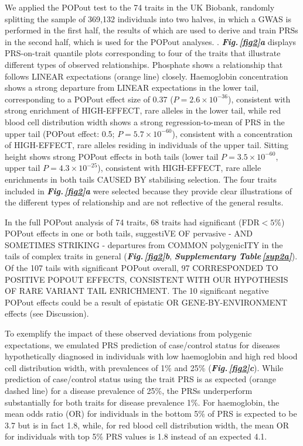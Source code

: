 \documentclass[12pt]{zHenriquesLab-StyleBioRxiv}
\newcommand\dref[2]{\normalsize{\textbf{\textit{Fig.\,\ref{#1}#2}}}\normalsize{}}
\newcommand\stref[1]{\normalsize{\textbf{\textit{Supplementary Table\,\ref{#1}}}}\normalsize{}}
\begin{document}
{{We applied the POPout test to the 74 traits in the UK Biobank, 
randomly splitting the sample of 369,132 individuals into two halves, 
in which a GWAS is performed in the first half, the results of which 
are used to derive and train PRSs in the second half, which is used 
for the POPout analyses. {\color{red}{The POPout test is performed in the same 
sample in which PRSs are trained, resulting in a conservative bias in 
POPout effects that we consider worthwhile to optimise sample 
size for testing in the tails (see Methods)}}. \dref{fig2}{a}  displays PRS-on-trait quantile plots corresponding 
to four of the traits that illustrate different types of 
observed relationships. Phosphate shows a relationship that 
follows LINEAR expectations (orange line) closely. 
Haemoglobin concentration shows a strong departure from 
LINEAR expectations in the lower tail, corresponding 
to a POPout effect size of 0.37 ($P = 2.6 \times 10^{-36}$), 
consistent with strong enrichment of HIGH-EFFECT, rare alleles in the lower 
tail, while red blood cell distribution width shows a strong 
regression-to-mean of PRS in the upper tail (POPout effect: 
0.5; $P = 5.7 \times 10^{-60}$), consistent with a concentration
of HIGH-EFFECT, rare alleles residing in individuals of 
the upper tail. Sitting height shows strong POPout effects in both 
tails (lower tail $P = 3.5 \times 10^{-60}$, upper 
tail $P = 4.3 \times 10^{-25}$), consistent with HIGH-EFFECT, rare allele 
enrichments in both tails CAUSED BY stabilising selection. The four 
traits included in \dref{fig2}{a}  were selected because they provide clear illustrations 
of the different types of relationship and are not reflective of 
the general results. 

In the full POPout analysis of 74 traits, 
68 traits had significant (FDR$<5\%$) POPout effects in one or both 
tails, suggestiVE OF pervasive - AND SOMETIMES STRIKING - departures from COMMON polygenicITY 
in the tails of complex traits in general (\dref{fig2}{b}, \stref{sup2a}). 
Of the 107 tails with significant 
POPout overall, 97 CORRESPONDED TO POSITIVE POPOUT 
EFFECTS, CONSISTENT WITH OUR HYPOTHESIS OF RARE 
VARIANT TAIL ENRICHMENT. The 10 significant negative POPout effects could be a result 
of epistatic OR GENE-BY-ENVIRONMENT effects (see Discussion).

To exemplify the impact of these observed deviations from 
polygenic expectations, we emulated PRS prediction of 
case/control status for diseases hypothetically diagnosed 
in individuals with low haemoglobin and high red blood cell 
distribution width, with prevalences of 1\% and 25\% (\dref{fig2}{c}). 
While prediction of case/control status using the trait PRS 
is as expected (orange dashed line) for a disease prevalence 
of 25\%, the PRSs underperform substantially for both 
traits for disease prevalence 1\%. For haemoglobin, the mean 
odds ratio (OR) for individuals in the bottom 5\% of PRS is 
expected to be 3.7 but is in fact 1.8, while, for red blood 
cell distribution width, the mean OR for individuals 
with top 5\% PRS values is 1.8 instead of an expected 4.1.

}}
\end{document}
